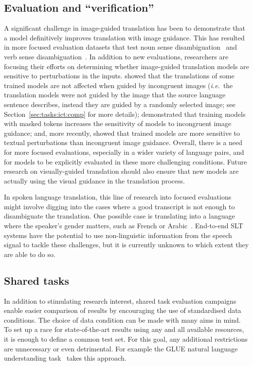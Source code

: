 \documentclass{svjour3}
\newcommand{\ie}[1]{\textit{i.e.}~#1}
\begin{document}
\subsection{Evaluation and ``verification''}

A significant challenge in image-guided translation has been to demonstrate that a model definitively improves translation with image guidance. This has resulted in more focused evaluation datasets that test noun sense disambiguation~\citep{elliott-findings-2017,lala-multimodal-2018} and verb sense disambiguation~\citep{gella-etal-2019-cross}. In addition to new evaluations, researchers are focusing their efforts on determining whether image-guided translation models are sensitive to perturbations in the inputs. \citet{elliott2018adversarial} showed that the translations of some trained models are not affected when guided by incongruent images (\ie{the translation models were not guided by the image that the source language sentence describes, instead they are guided by a randomly selected image; see Section~\ref{sec:tasks:ict:comp} for more details}); \citet{caglayan-probing-2019} demonstrated that training models with masked tokens increases the sensitivity of models to incongruent image guidance; and, more recently, \citet{dutta-chowdhury-elliott-2019-understanding} showed that trained models are more sensitive to textual perturbations than incongruent image guidance. Overall, there is a need for more focused evaluations, especially in a wider variety of language pairs, and for models to be explicitly evaluated in these more challenging conditions. Future research on visually-guided translation should also ensure that new models are actually using the visual guidance in the translation process.

In spoken language translation, this line of research into focused evaluations might involve digging into the cases where a good transcript is not enough to disambiguate the translation. One possible case is translating into a language where the speaker's gender matters, such as French or Arabic~\citep{elaraby2018gender}.
End-to-end SLT systems have the potential to use non-linguistic information from the speech signal to tackle these challenges, but it is currently unknown to which extent they are able to do so. 

\subsection{Shared tasks}

In addition to stimulating research interest, shared task evaluation campaigns enable easier comparison of results by encouraging the use of standardised data conditions.
The choice of data condition can be made with many aims in mind.
To set up a race for state-of-the-art results using any and all available resources,
it is enough to define a common test set.
For this goal, any additional restrictions are unnecessary or even detrimental.
For example the GLUE natural language understanding task~\citep{wang-etal-2018-glue} takes this approach.
\end{document}
